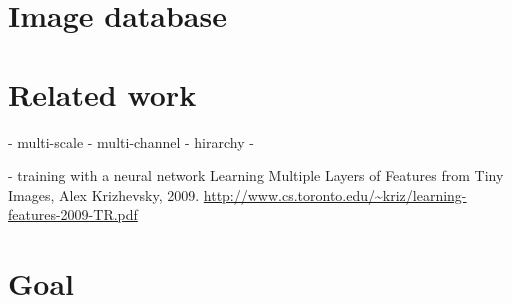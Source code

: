 \section{Image database}

\section{Related work}
- multi-scale
- multi-channel
- hirarchy
- 

- training with a neural network
Learning Multiple Layers of Features from Tiny Images, Alex Krizhevsky, 2009.
\url{http://www.cs.toronto.edu/~kriz/learning-features-2009-TR.pdf}

\section{Goal}
